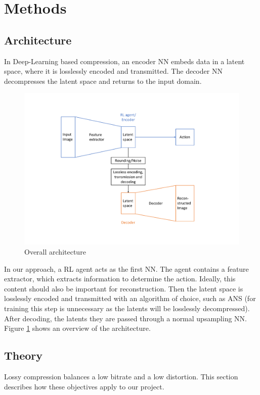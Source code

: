 \section{Methods}

\subsection{Architecture}\label{methods:Architecture}
    In Deep-Learning based compression, an encoder NN embeds data in a latent space, where it is losslessly encoded and transmitted. The decoder NN decompresses the latent space and returns to the input domain.

    \begin{figure}[H]
        \centering
        \includegraphics[width=\linewidth]{images/architecture.pdf}
        \caption{Overall architecture}
        \label{fig:Architecture}
    \end{figure}

    In our approach, a RL agent acts as the first
    NN. The agent contains a feature extractor, which
    extracts information to determine
    the action. Ideally, this content should also be important
    for reconstruction. Then the latent space is losslessly encoded and
    transmitted with an algorithm of choice, such as ANS (for training this
    step is unnecessary as the latents will be losslessly decompressed). After decoding, the latents they are passed through a normal upsampling NN.
    Figure \ref{fig:Architecture} shows an overview of the architecture.

\subsection{Theory}
    Lossy compression balances a low bitrate and a low distortion.
    This section describes how these objectives apply to our project.

